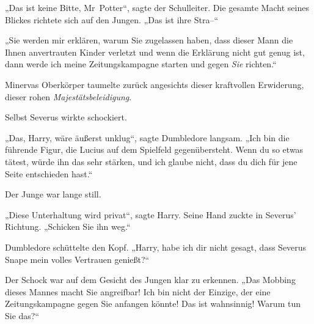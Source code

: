 „Das ist keine Bitte, Mr~Potter“, sagte der Schulleiter. Die gesamte Macht seines Blickes richtete sich auf den Jungen. „Das ist ihre Stra–“

„Sie werden mir erklären, warum Sie zugelassen haben, dass dieser Mann die Ihnen anvertrauten Kinder verletzt und wenn die Erklärung nicht gut genug ist, dann werde ich meine Zeitungskampagne starten und gegen \emph{Sie} richten.“

Minervas Oberkörper taumelte zurück angesichts dieser kraftvollen Erwiderung, dieser rohen \emph{Majestätsbeleidigung}.

Selbst Severus wirkte schockiert.

„Das, Harry, wäre äußerst unklug“, sagte Dumbledore langsam. „Ich bin die führende Figur, die Lucius auf dem Spielfeld gegenübersteht. Wenn du so etwas tätest, würde ihn das sehr stärken, und ich glaube nicht, dass du dich für jene Seite entschieden hast.“

Der Junge war lange still.

„Diese Unterhaltung wird privat“, sagte Harry. Seine Hand zuckte in Severus’ Richtung. „Schicken Sie ihn weg.“

Dumbledore schüttelte den Kopf. „Harry, habe ich dir nicht gesagt, dass Severus Snape mein volles Vertrauen genießt?“

Der Schock war auf dem Gesicht des Jungen klar zu erkennen. „Das Mobbing dieses Mannes macht Sie angreifbar! Ich bin nicht der Einzige, der eine Zeitungskampagne gegen Sie anfangen könnte! Das ist wahnsinnig! Warum tun Sie das?“

